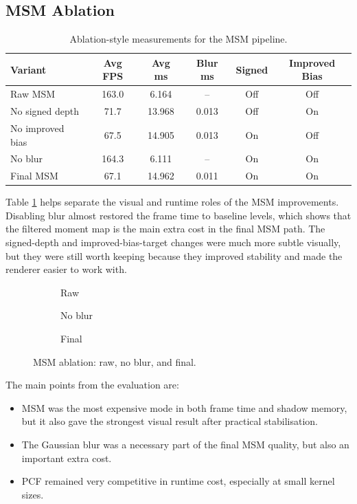 \subsection{MSM Ablation}

\begin{table}[H]
    \centering
    \caption{Ablation-style measurements for the MSM pipeline.}
    \label{tab:msm_ablation}
    \begin{tabular}{lccccc}
        \toprule
        Variant & Avg FPS & Avg ms & Blur ms & Signed & Improved Bias \\
        \midrule
        Raw MSM & 163.0 & 6.164 & --    & Off & Off \\
        No signed depth & 71.7 & 13.968 & 0.013 & Off & On \\
        No improved bias & 67.5 & 14.905 & 0.013 & On & Off \\
        No blur & 164.3 & 6.111 & --    & On & On \\
        Final MSM & 67.1 & 14.962 & 0.011 & On & On \\
        \bottomrule
    \end{tabular}
\end{table}

Table \ref{tab:msm_ablation} helps separate the visual and runtime roles of the MSM improvements. Disabling blur almost restored the frame time to baseline levels, which shows that the filtered moment map is the main extra cost in the final MSM path. The signed-depth and improved-bias-target changes were much more subtle visually, but they were still worth keeping because they improved stability and made the renderer easier to work with.

\begin{figure}[H]
    \centering
    \begin{subfigure}[b]{0.31\linewidth}
        \centering
        \caption{Raw}
    \end{subfigure}
    \hfill
    \begin{subfigure}[b]{0.31\linewidth}
        \centering
        \caption{No blur}
    \end{subfigure}
    \hfill
    \begin{subfigure}[b]{0.31\linewidth}
        \centering
        \caption{Final}
    \end{subfigure}
    \caption{MSM ablation: raw, no blur, and final.}
    \label{fig:msm_ablation}
\end{figure}

The main points from the evaluation are:
\begin{itemize}
    \item MSM was the most expensive mode in both frame time and shadow memory, but it also gave the strongest visual result after practical stabilisation.
    \item The Gaussian blur was a necessary part of the final MSM quality, but also an important extra cost.
    \item PCF remained very competitive in runtime cost, especially at small kernel sizes.
\end{itemize}
